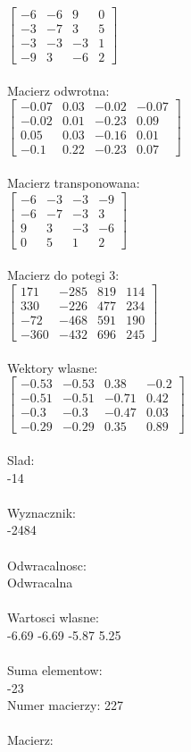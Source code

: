 \documentclass[a4paper,12pt]{article}
\begin{document}
$\begin{bmatrix} -6&-6&9&0\\-3&-7&3&5\\-3&-3&-3&1\\-9&3&-6&2 \end{bmatrix}$
\\
\\
Macierz odwrotna:\\

$\begin{bmatrix} -0.07&0.03&-0.02&-0.07\\-0.02&0.01&-0.23&0.09\\0.05&0.03&-0.16&0.01\\-0.1&0.22&-0.23&0.07 \end{bmatrix}$
\\
\\
Macierz transponowana:\\

$\begin{bmatrix} -6&-3&-3&-9\\-6&-7&-3&3\\9&3&-3&-6\\0&5&1&2 \end{bmatrix}$
\\
\\
Macierz do potegi 3:\\

$\begin{bmatrix} 171&-285&819&114\\330&-226&477&234\\-72&-468&591&190\\-360&-432&696&245 \end{bmatrix}$
\\
\\
Wektory wlasne:\\

$\begin{bmatrix} -0.53&-0.53&0.38&-0.2\\-0.51&-0.51&-0.71&0.42\\-0.3&-0.3&-0.47&0.03\\-0.29&-0.29&0.35&0.89 \end{bmatrix}$
\\
\\
Slad:\\
-14
\\
\\
Wyznacznik:\\
-2484
\\
\\
Odwracalnosc:\\
Odwracalna
\\
\\
Wartosci wlasne:\\
-6.69 -6.69 -5.87 5.25
\\
\\
Suma elementow:\\
-23
\\
\newpage
Numer macierzy:
227
\\
\\
Macierz:\\
\end{document}
